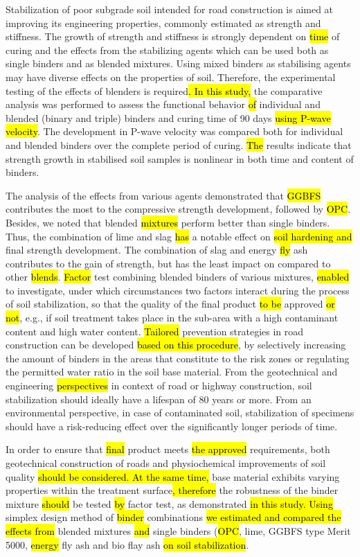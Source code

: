 \documentclass[materials,article,submit,pdftex,moreauthors]{Definitions/mdpi}
\begin{document}
Stabilization of poor subgrade soil intended for road construction is aimed at improving its engineering properties, commonly estimated as strength and stiffness. The growth of strength and stiffness is strongly dependent on \hl{time} of curing and the effects from the stabilizing agents which can be used both as single binders and as blended mixtures. Using mixed binders as stabilising agents may have diverse effects on the properties of soil. Therefore, the experimental testing of the effects of blenders is required\hl{. In this study,} the comparative analysis was performed to assess the functional behavior \hl{of }individual and blended (binary and triple) binders and curing time of 90 days \hl{using P-wave velocity}. The development in P-wave velocity was compared both for individual and blended binders over the complete period of curing. \hl{The} results indicate that strength growth in stabilised soil samples is nonlinear in both time and content of binders. 

The analysis of the effects from various agents demonstrated that \hl{GGBFS} contributes the most to the compressive strength development, followed by \hl{OPC}. Besides, we noted that blended \hl{mixtures} perform better than single binders. Thus, the combination of lime and slag \hl{has} a notable effect on \hl{soil hardening and} final strength development. The combination of slag and energy \hl{fly} ash contributes to the gain of strength, but has the least impact on compared to other \hl{blends}. \hl{Factor} test combining blended binders of various mixtures, \hl{enabled} to investigate, under which circumstances two factors interact during the process of soil stabilization, so that the quality of the final product \hl{to be} approved \hl{or not}, e.g., if soil treatment takes place in the sub-area with a high contaminant content and high water content. \hl{Tailored} prevention strategies in road construction can be developed \hl{based on this procedure}, by selectively increasing the amount of binders in the areas that constitute to the risk zones or regulating the permitted water ratio in the soil base material. From the geotechnical and engineering \hl{perspectives} in context of road or highway construction, soil stabilization should ideally have a lifespan of 80 years or more. From an environmental perspective, in case of contaminated soil, stabilization of specimens should have a risk-reducing effect over the significantly longer periods of time. 

In order to ensure that \hl{final} product meets \hl{the approved} requirements, both geotechnical construction of roads and physiochemical improvements of soil quality \hl{should be considered. At the same time,} base material exhibits varying properties within the treatment surface\hl{, therefore} the robustness of the binder mixture \hl{should} be tested \hl{by} factor test, as demonstrated \hl{in this study. Using} simplex design method of \hl{binder} combinations \hl{we estimated and compared the effects from} blended mixtures \hl{and} single binders (\hl{OPC}, lime,\hl{ }GGBFS type Merit 5000, \hl{energy} fly ash and bio flay ash \hl{on soil stabilization}.
\end{document}
